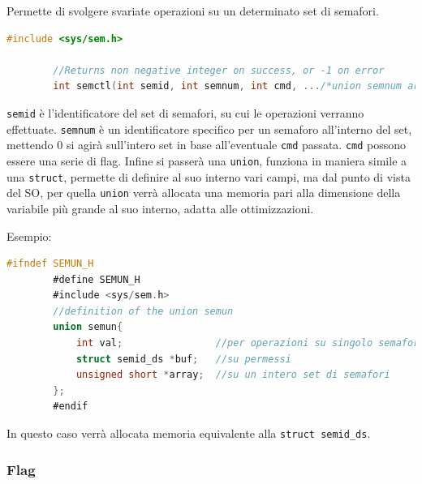 \documentclass[a4paper, 12pt]{book}
\begin{document}
    Permette di svolgere svariate operazioni su un determinato 
    set di semafori.
    \begin{lstlisting}[language=C]
        #include <sys/sem.h>

        //Returns non negative integer on success, or -1 on error 
        int semctl(int semid, int semnum, int cmd, .../*union semnum arg*/);
    \end{lstlisting}
    \verb|semid| è l'identificatore del set di semafori, su 
    cui le operazioni verranno effettuate. \verb|semnum|
    è un identificatore specifico per un semaforo all'interno del 
    set, mettendo 0 si agirà sull'intero set in base all'eventuale \verb|cmd|
    passata.
    \verb|cmd| possono essere una serie di flag. Infine si passerà 
    una \verb|union|,
    funziona in maniera simile a una \verb|struct|, permette di definire al 
    suo interno vari campi, ma dal punto di vista del SO, 
    per quella \verb|union| verrà allocata una memoria pari alla 
    dimensione della variabile più grande al suo interno, adatta
    alle ottimizzazioni.

    Esempio:
    \begin{lstlisting}[language=C]
        #ifndef SEMUN_H
        #define SEMUN_H
        #include <sys/sem.h>
        //definition of the union semun 
        union semun{
            int val;                //per operazioni su singolo semaforo
            struct semid_ds *buf;   //su permessi 
            unsigned short *array;  //su un intero set di semafori
        };
        #endif
    \end{lstlisting}
    In questo caso verrà allocata memoria equivalente alla 
    \verb|struct semid_ds|.

    \subsubsection{Flag}
\end{document}

